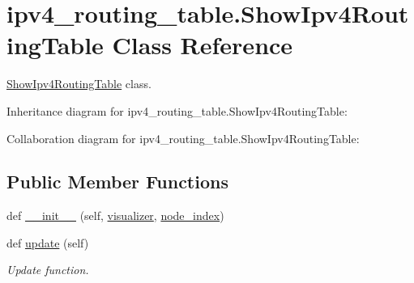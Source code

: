 \hypertarget{classipv4__routing__table_1_1ShowIpv4RoutingTable}{}\section{ipv4\+\_\+routing\+\_\+table.\+Show\+Ipv4\+Routing\+Table Class Reference}
\label{classipv4__routing__table_1_1ShowIpv4RoutingTable}


\hyperlink{classipv4__routing__table_1_1ShowIpv4RoutingTable}{Show\+Ipv4\+Routing\+Table} class.  




Inheritance diagram for ipv4\+\_\+routing\+\_\+table.\+Show\+Ipv4\+Routing\+Table\+:


Collaboration diagram for ipv4\+\_\+routing\+\_\+table.\+Show\+Ipv4\+Routing\+Table\+:
\subsection*{Public Member Functions}
\begin{DoxyCompactItemize}
\item 
def \hyperlink{classipv4__routing__table_1_1ShowIpv4RoutingTable_a83fbfa89f555d17844f71ddc3146557f}{\+\_\+\+\_\+init\+\_\+\+\_\+} (self, \hyperlink{classipv4__routing__table_1_1ShowIpv4RoutingTable_aaffe658fdd5746d8db628aae110374fc}{visualizer}, \hyperlink{classipv4__routing__table_1_1ShowIpv4RoutingTable_af135b23094260a6c002cc7d8bb6b479b}{node\+\_\+index})
\item 
def \hyperlink{classipv4__routing__table_1_1ShowIpv4RoutingTable_aa7e3b727e4337a734ae6e87c40159948}{update} (self)
\begin{DoxyCompactList}\small\item\em Update function. \end{DoxyCompactList}\end{DoxyCompactItemize}

